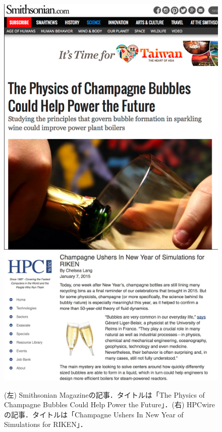 \documentclass[topics,b5paper,papersize,twocolumn]{jsarticle}
\begin{document}
\begin{figure}[bt]
\includegraphics[width=0.35\linewidth]{smithsonian.jpg}
\includegraphics[width=0.65\linewidth]{hpcwire.jpg}
\caption{
(左) Smithsonian Magazineの記事．タイトルは「The Physics of Champagne Bubbles Could Help Power the Future」．(右) HPCwireの記事．タイトルは「Champagne Ushers In New Year of Simulations for RIKEN」．
}
\end{figure}
\end{document}
